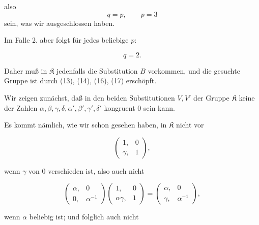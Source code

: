 
also
\[
q=p,\qquad p=3
\]
sein, was wir ausgeschlossen haben.

Im Falle 2. aber folgt für jedes beliebige $p$:

\[ q=2. \]

Daher muß in $\mathfrak{K}$ jedenfalls die Substitution $B$ vorkommen, und die gesuchte Gruppe ist durch (13), (14), (16), (17) erschöpft.

Wir zeigen zunächst, daß in den beiden Substitutionen $V, V'$ der Gruppe $\mathfrak{K}$ keine der Zahlen $\alpha,\beta,\gamma,\delta,\alpha',\beta',\gamma',\delta'$ kongruent $0$ sein kann.

Es kommt nämlich, wie wir schon gesehen haben, in $\mathfrak{K}$ nicht vor

\[ \begin{pmatrix}1, & 0\\ \gamma, & 1\end{pmatrix}, \]

wenn $\gamma$ von $0$ verschieden ist, also auch nicht

\[ \begin{pmatrix}\alpha, & 0\\ 0, & \alpha^{-1}\end{pmatrix}\begin{pmatrix}1, & 0\\ \alpha\gamma, & 1\end{pmatrix}=\begin{pmatrix}\alpha, & 0\\ \gamma, & \alpha^{-1}\end{pmatrix}, \]

wenn $\alpha$ beliebig ist; und folglich auch nicht

